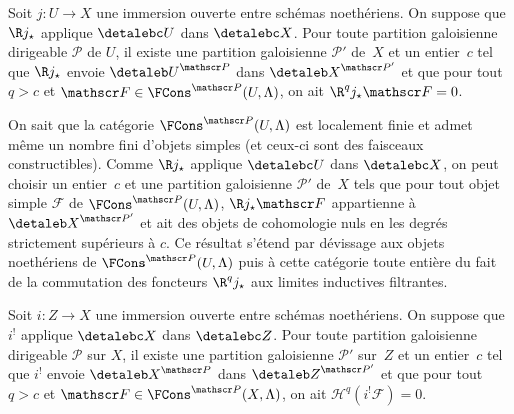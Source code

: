 \documentclass[10pt]{../fichiers-configuration-latex/smfart}
\begin{document}
\begin{proposition2}\label{17-proposition-r-j-star-preserve-d-b-partitionne}
Soit $j\colon U\to X$ une immersion ouverte entre schémas noethériens. On
suppose que $\R j_\star$ applique $\detalebc U$ dans $\detalebc X$. Pour
toute partition galoisienne dirigeable $\mathscr P$ de $U$, il existe une
partition galoisienne $\mathscr P'$ de $X$ et un entier $c$ tel que
$\R j_\star$ envoie ${\detaleb U}^{\mathscr P}$ dans
${\detaleb X}^{\mathscr P'}$ et que pour tout $q>c$ et
$\mathscr F\in\FCons^{\mathscr P}(U,\Lambda)$, on ait $\R^q j_\star
\mathscr F=0$.
\end{proposition2}

On sait que la catégorie $\FCons^{\mathscr P}(U,\Lambda)$ est localement
finie et admet même un nombre fini d'objets simples (et ceux-ci sont des
faisceaux constructibles). Comme $\R j_\star$ applique $\detalebc U$ dans
$\detalebc X$, on peut choisir un entier $c$ et une partition galoisienne
$\mathscr P'$ de $X$ tels que pour tout objet simple $\mathscr F$ de
$\FCons^{\mathscr P}(U,\Lambda)$, $\R j_\star \mathscr F$
appartienne à ${\detaleb X}^{\mathscr P'}$ et ait des objets de cohomologie
nuls en les degrés strictement supérieurs à $c$. Ce résultat s'étend par
dévissage aux objets noethériens de $\FCons^{\mathscr P}(U,\Lambda)$ puis à
cette catégorie toute entière du fait de la commutation des foncteurs
$\R^q j_\star$ aux limites inductives filtrantes.

\begin{corollaire2}\label{17-corollaire-i-bang-preserve-d-b-partitionne}
Soit $i\colon Z\to X$ une immersion ouverte entre schémas noethériens. On
suppose que $i^!$ applique $\detalebc X$ dans $\detalebc Z$. Pour toute partition
galoisienne dirigeable $\mathscr P$ sur $X$, il existe une partition
galoisienne $\mathscr P'$ sur $Z$ et un entier $c$ tel que
$i^!$ envoie ${\detaleb X}^{\mathscr P}$ dans ${\detaleb Z}^{\mathscr P'}$ et que
pour tout $q>c$ et $\mathscr F\in\FCons^{\mathscr P}(X,\Lambda)$, on ait
$\mathscr H^q(i^!\mathscr F)=0$.
\end{corollaire2}
\end{document}
